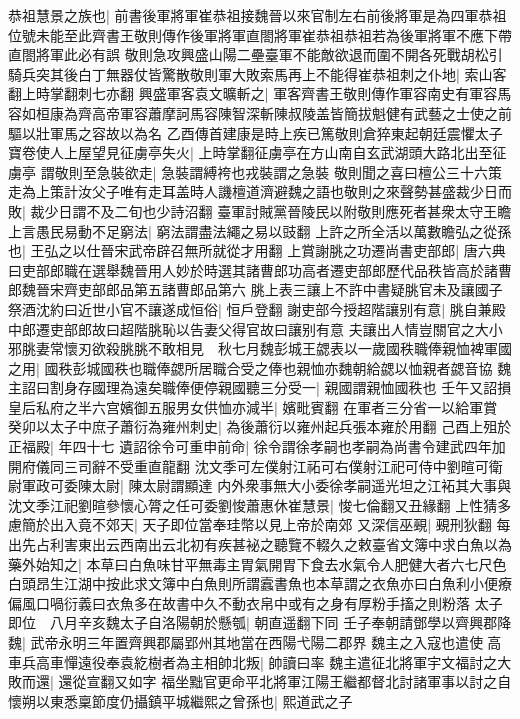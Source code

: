 恭祖慧景之族也|{
	前書後軍將軍崔恭祖接魏晉以來官制左右前後將軍是為四軍恭祖位號未能至此齊書王敬則傳作後軍將軍直閤將軍崔恭祖恭祖若為後軍將軍不應下帶直閤將軍此必有誤}
敬則急攻興盛山陽二壘臺軍不能敵欲退而圍不開各死戰胡松引騎兵突其後白丁無器仗皆驚散敬則軍大敗索馬再上不能得崔恭祖刺之仆地|{
	索山客翻上時掌翻刺七亦翻}
興盛軍客袁文曠斬之|{
	軍客齊書王敬則傳作軍容南史有軍容馬容如桓康為齊高帝軍容蕭摩訶馬容陳智深斬陳叔陵盖皆簡拔魁健有武藝之士使之前驅以壯軍馬之容故以為名}
乙酉傳首建康是時上疾已篤敬則倉猝東起朝廷震懼太子寶卷使人上屋望見征虜亭失火|{
	上時掌翻征虜亭在方山南自玄武湖頭大路北出至征虜亭}
謂敬則至急裝欲走|{
	急裝謂縛袴也戎裝謂之急裝}
敬則聞之喜曰檀公三十六策走為上策計汝父子唯有走耳盖時人譏檀道濟避魏之語也敬則之來聲勢甚盛裁少日而敗|{
	裁少日謂不及二旬也少詩沼翻}
臺軍討賊黨晉陵民以附敬則應死者甚衆太守王瞻上言愚民易動不足窮法|{
	窮法謂盡法繩之易以豉翻}
上許之所全活以萬數瞻弘之從孫也|{
	王弘之以仕晉宋武帝辟召無所就從才用翻}
上賞謝脁之功遷尚書吏部郎|{
	唐六典曰吏部郎職在選舉魏晉用人妙於時選其諸曹郎功高者遷吏部郎歷代品秩皆高於諸曹郎魏晉宋齊吏部郎品第五諸曹郎品第六}
朓上表三讓上不許中書疑朓官未及讓國子祭酒沈約曰近世小官不讓遂成恒俗|{
	恒戶登翻}
謝吏部今授超階讓别有意|{
	朓自兼殿中郎遷吏部郎故曰超階朓恥以告妻父得官故曰讓别有意}
夫讓出人情豈關官之大小邪朓妻常懷刃欲殺朓朓不敢相見　秋七月魏彭城王勰表以一歲國秩職俸親恤裨軍國之用|{
	國秩彭城國秩也職俸勰所居職合受之俸也親恤亦魏朝給勰以恤親者勰音協}
魏主詔曰割身存國理為遠矣職俸便停親國聽三分受一|{
	親國謂親恤國秩也}
壬午又詔損皇后私府之半六宫嬪御五服男女供恤亦減半|{
	嬪毗賓翻}
在軍者三分省一以給軍賞　癸卯以太子中庶子蕭衍為雍州刺史|{
	為後蕭衍以雍州起兵張本雍於用翻}
己酉上殂於正福殿|{
	年四十七}
遺詔徐令可重申前命|{
	徐令謂徐孝嗣也孝嗣為尚書令建武四年加開府儀同三司辭不受重直龍翻}
沈文季可左僕射江祏可右僕射江祀可侍中劉暄可衛尉軍政可委陳太尉|{
	陳太尉謂顯達}
内外衆事無大小委徐孝嗣遥光坦之江袥其大事與沈文季江祀劉暄參懷心膂之任可委劉悛蕭惠休崔慧景|{
	悛七倫翻又丑緣翻}
上性猜多慮簡於出入竟不郊天|{
	天子即位當奉珪幣以見上帝於南郊}
又深信巫覡|{
	覡刑狄翻}
每出先占利害東出云西南出云北初有疾甚袐之聽覽不輟久之敕臺省文簿中求白魚以為藥外始知之|{
	本草曰白魚味甘平無毒主胃氣開胃下食去水氣令人肥健大者六七尺色白頭昂生江湖中按此求文簿中白魚則所謂蠧書魚也本草謂之衣魚亦曰白魚利小便療偏風口喎衍義曰衣魚多在故書中久不動衣帛中或有之身有厚粉手搐之則粉落}
太子即位　八月辛亥魏太子自洛陽朝於懸瓠|{
	朝直遥翻下同}
壬子奉朝請鄧學以齊興郡降魏|{
	武帝永明三年置齊興郡屬郢州其地當在西陽弋陽二郡界}
魏主之入寇也遣使高車兵高車憚遠役奉袁紇樹者為主相帥北叛|{
	帥讀曰率}
魏主遣征北將軍宇文福討之大敗而還|{
	還從宣翻又如字}
福坐黜官更命平北將軍江陽王繼都督北討諸軍事以討之自懷朔以東悉稟節度仍攝鎮平城繼熙之曾孫也|{
	熙道武之子}
